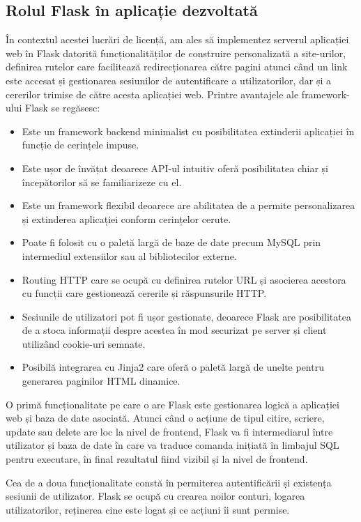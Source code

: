\documentclass[12pt, a4paper, oneside, romanian]{teza-upb}
\begin{document}
	\subsection{Rolul Flask în aplicație dezvoltată}
	În contextul acestei lucrări de licență, am ales să implementez serverul aplicației web în Flask datorită funcționalităților de construire personalizată a site-urilor, definirea rutelor care facilitează redirecționarea către pagini atunci când un link este accesat și gestionarea sesiunilor de autentificare a utilizatorilor, dar și a cererilor trimise de către acesta aplicației web. Printre avantajele ale framework-ului Flask se regăsesc:
	\begin{itemize}
		\item Este un framework backend minimalist cu posibilitatea extinderii aplicației în funcție de cerințele impuse.
		\item Este ușor de învățat deoarece API-ul intuitiv oferă posibilitatea chiar și începătorilor să se familiarizeze cu el.
		\item Este un framework flexibil deoarece are abilitatea de a permite personalizarea și extinderea aplicației conform cerințelor cerute.
		\item Poate fi folosit cu o paletă largă de baze de date precum MySQL prin intermediul extensiilor sau al bibliotecilor externe.
		\item Routing HTTP care se ocupă cu definirea rutelor URL și asocierea acestora cu funcții care gestionează cererile și răspunsurile HTTP.\item Sesiunile de utilizatori pot fi ușor gestionate, deoarece Flask are posibilitatea de a stoca informații despre acestea în mod securizat pe server și client utilizând cookie-uri semnate.
		\item Posibilă integrarea cu Jinja2 care oferă o paletă largă de unelte pentru generarea paginilor HTML dinamice.
	\end{itemize}
	
	O primă funcționalitate pe care o are Flask este gestionarea logică a aplicației web și baza de date asociată. Atunci când o acțiune de tipul citire, scriere, update sau delete are loc la nivel de frontend, Flask va fi intermediarul între utilizator și baza de date în care va traduce comanda inițiată în limbajul SQL pentru executare, în final rezultatul fiind vizibil și la nivel de frontend.
	
	Cea de a doua funcționalitate constă în permiterea autentificării și existența sesiunii de utilizator. Flask se ocupă cu crearea noilor conturi, logarea utilizatorilor, reținerea cine este logat și ce acțiuni îi sunt permise.
	
\end{document}
